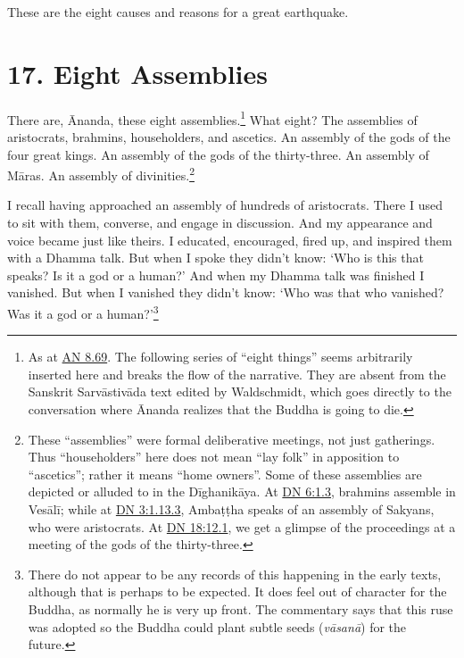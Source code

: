 \documentclass[12pt,openany]{book}%
\begin{document}
These are the eight causes and reasons for a great earthquake. 

\section*{17. Eight Assemblies }

There are, Ānanda, these eight assemblies.\footnote{As at \href{https://suttacentral.net/an8.69/en/sujato}{AN 8.69}. The following series of “eight things” seems arbitrarily inserted here and breaks the flow of the narrative. They are absent from the Sanskrit \textsanskrit{Sarvāstivāda} text edited by Waldschmidt, which goes directly to the conversation where Ānanda realizes that the Buddha is going to die. } What eight? The assemblies of aristocrats, brahmins, householders, and ascetics. An assembly of the gods of the four great kings. An assembly of the gods of the thirty-three. An assembly of \textsanskrit{Māras}. An assembly of divinities.\footnote{These “assemblies” were formal deliberative meetings, not just gatherings. Thus “householders” here does not mean “lay folk” in apposition to “ascetics”; rather it means “home owners”. Some of these assemblies are depicted or alluded to in the \textsanskrit{Dīghanikāya}. At \href{https://suttacentral.net/dn6/en/sujato\#1.3}{DN 6:1.3}, brahmins assemble in \textsanskrit{Vesālī}; while at \href{https://suttacentral.net/dn3/en/sujato\#1.13.3}{DN 3:1.13.3}, \textsanskrit{Ambaṭṭha} speaks of an assembly of Sakyans, who were aristocrats. At \href{https://suttacentral.net/dn18/en/sujato\#12.1}{DN 18:12.1}, we get a glimpse of the proceedings at a meeting of the gods of the thirty-three. } 

I recall having approached an assembly of hundreds of aristocrats. There I used to sit with them, converse, and engage in discussion. And my appearance and voice became just like theirs. I educated, encouraged, fired up, and inspired them with a Dhamma talk. But when I spoke they didn’t know: ‘Who is this that speaks? Is it a god or a human?’ And when my Dhamma talk was finished I vanished. But when I vanished they didn’t know: ‘Who was that who vanished? Was it a god or a human?’\footnote{There do not appear to be any records of this happening in the early texts, although  that is perhaps to be expected. It does feel out of character for the Buddha, as normally he is very up front. The commentary says that this ruse was adopted so the Buddha could plant subtle seeds (\textit{\textsanskrit{vāsanā}}) for the future. } 
\end{document}
